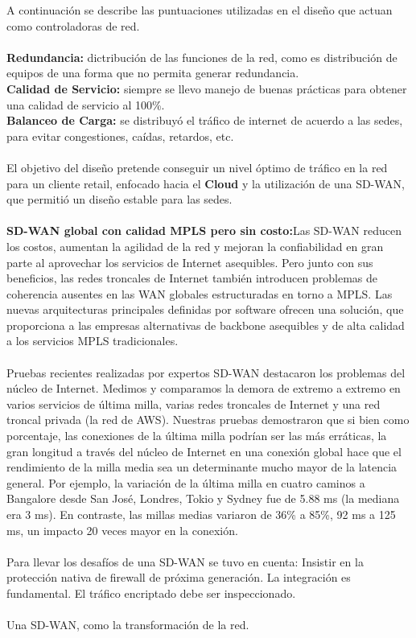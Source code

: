 A continuación se describe las puntuaciones utilizadas en el diseño que actuan como controladoras de red.
\\
\\
\textbf{Redundancia:} dictribución de las funciones de la red, como es distribución de equipos de una forma que no permita generar redundancia.
\\
\textbf{Calidad de Servicio:} siempre se llevo manejo de buenas prácticas para obtener una calidad de servicio al 100\%.
\\
\textbf{Balanceo de Carga:} se distribuyó el tráfico de internet de acuerdo a las sedes, para evitar congestiones, caídas, retardos, etc.
\\
\\
El objetivo del diseño pretende conseguir un nivel óptimo de tráfico en la red para un cliente retail, enfocado hacia el \textbf{Cloud} y la utilización de una SD-WAN, que permitió un diseño estable para las sedes.
\\
\\
\textbf{SD-WAN global con calidad MPLS pero sin costo:}Las SD-WAN reducen los costos, aumentan la agilidad de la red y mejoran la confiabilidad en gran parte al aprovechar los servicios de Internet asequibles. Pero junto con sus beneficios, las redes troncales de Internet también introducen problemas de coherencia ausentes en las WAN globales estructuradas en torno a MPLS. Las nuevas arquitecturas principales definidas por software ofrecen una solución, que proporciona a las empresas alternativas de backbone asequibles y de alta calidad a los servicios MPLS tradicionales.
\\
\\
Pruebas recientes realizadas por expertos SD-WAN destacaron los problemas del núcleo de Internet. Medimos y comparamos la demora de extremo a extremo en varios servicios de última milla, varias redes troncales de Internet y una red troncal privada (la red de AWS). Nuestras pruebas demostraron que si bien como porcentaje, las conexiones de la última milla podrían ser las más erráticas, la gran longitud a través del núcleo de Internet en una conexión global hace que el rendimiento de la milla media sea un determinante mucho mayor de la latencia general. Por ejemplo, la variación de la última milla en cuatro caminos a Bangalore desde San José, Londres, Tokio y Sydney fue de 5.88 ms (la mediana era 3 ms). En contraste, las millas medias variaron de 36\% a 85\%, 92 ms a 125 ms, un impacto 20 veces mayor en la conexión.
\\
\\
Para llevar los desafíos de una SD-WAN se tuvo en cuenta:
Insistir en la protección nativa de firewall de próxima generación.
La integración es fundamental.
El tráfico encriptado debe ser inspeccionado.
\\
\\Una SD-WAN, como la transformación de la red.






